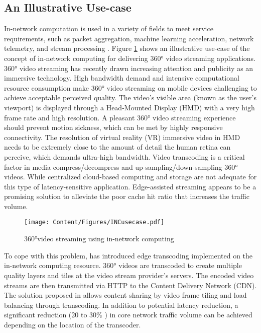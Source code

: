 \subsection{An Illustrative Use-case}\label{sec:Usecases}
\noindent In-network computation is used in a variety of fields to meet service requirements, such as packet aggregation, machine learning acceleration, network telemetry, and stream processing \cite{10.11453386367.3431302}.  
Figure \ref{fig:INCusecase} shows an illustrative use-case of the concept of in-network computing for delivering 360° video streaming applications. 360° video streaming has recently drawn increasing attention and publicity as an immersive technology. High bandwidth demand and intensive computational resource consumption make 360° video streaming on mobile devices challenging to achieve acceptable perceived quality. The video's visible area (known as the user's viewport)
 is displayed through a Head-Mounted Display (HMD) with a very high frame rate and high resolution. A pleasant 360° video streaming experience should prevent motion sickness, which can be met by highly responsive connectivity. The resolution of virtual reality (VR) immersive video in HMD needs to be extremely close to the amount of detail the human retina can perceive, which demands ultra-high bandwidth.
Video transcoding is a critical factor in media compress/decompress and up-sampling/down-sampling 360° videos. While centralized cloud-based computing and storage are not adequate for this type of latency-sensitive application. Edge-assisted streaming appears to be a promising solution to alleviate the poor cache hit ratio that increases the traffic volume.
%
\begin{figure}
\centering
\texttt{[image: Content/Figures/INCusecase.pdf]}
\caption{360°video streaming using in-network computing}
\label{fig:INCusecase}
\end{figure}
To cope with this problem, \cite{8756899} has introduced edge transcoding implemented on the in-network computing resource. 
360° videos are transcoded to create multiple quality layers and tiles at the video stream provider's servers. %
The encoded video streams are then transmitted via HTTP to the Content Delivery Network (CDN). The solution proposed in \cite{8756899} allows content sharing by video frame tiling and load balancing through transcoding. In addition to potential latency reduction, a significant reduction (20 to 30\% ) in core network traffic volume can be achieved depending on the location of the transcoder.

